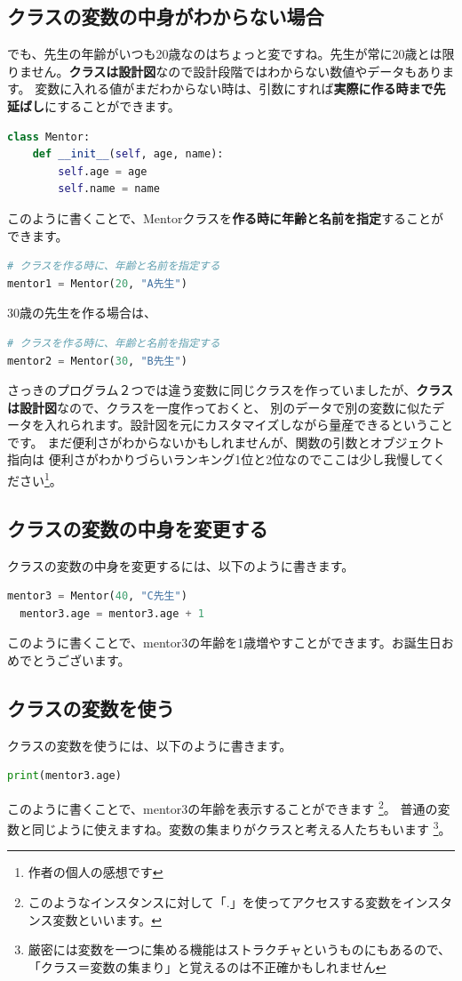\documentclass[12pt, a4paper, dvipdfmx]{book}
\begin{document}
\subsection{クラスの変数の中身がわからない場合}
でも、先生の年齢がいつも20歳なのはちょっと変ですね。先生が常に20歳とは限りません。\textbf{クラスは設計図}なので設計段階ではわからない数値やデータもあります。
変数に入れる値がまだわからない時は、引数にすれば\textbf{実際に作る時まで先延ばし}にすることができます。
\begin{lstlisting}[caption=引数を使う場合,label=sample, language=Python]
class Mentor:
    def __init__(self, age, name):
        self.age = age
        self.name = name
\end{lstlisting}
このように書くことで、Mentorクラスを\textbf{作る時に年齢と名前を指定}することができます。
\begin{lstlisting}[caption=Mentorクラスの作り方,label=sample, language=Python]
# クラスを作る時に、年齢と名前を指定する
mentor1 = Mentor(20, "A先生")
\end{lstlisting}
30歳の先生を作る場合は、
\begin{lstlisting}[caption=Mentorクラスの作り方,label=sample, language=Python]
# クラスを作る時に、年齢と名前を指定する
mentor2 = Mentor(30, "B先生")
\end{lstlisting}
さっきのプログラム２つでは違う変数に同じクラスを作っていましたが、\textbf{クラスは設計図}なので、クラスを一度作っておくと、
別のデータで別の変数に似たデータを入れられます。設計図を元にカスタマイズしながら量産できるということです。
まだ便利さがわからないかもしれませんが、関数の引数とオブジェクト指向は
便利さがわかりづらいランキング1位と2位なのでここは少し我慢してください\footnote{作者の個人の感想です}。

\subsection{クラスの変数の中身を変更する}
クラスの変数の中身を変更するには、以下のように書きます。
\begin{lstlisting}[caption=クラスの変数の中身を変更する,label=sample, language=Python]
  mentor3 = Mentor(40, "C先生")
  mentor3.age = mentor3.age + 1
\end{lstlisting}
このように書くことで、mentor3の年齢を1歳増やすことができます。お誕生日おめでとうございます。
\subsection{クラスの変数を使う}
クラスの変数を使うには、以下のように書きます。
\begin{lstlisting}[caption=クラスの変数を使う,label=sample, language=Python]
  print(mentor3.age)
\end{lstlisting}
このように書くことで、mentor3の年齢を表示することができます
\footnote{このようなインスタンスに対して「.」を使ってアクセスする変数をインスタンス変数といいます。}。
普通の変数と同じように使えますね。変数の集まりがクラスと考える人たちもいます
\footnote{厳密には変数を一つに集める機能はストラクチャというものにもあるので、「クラス＝変数の集まり」と覚えるのは不正確かもしれません}。
\end{document}
